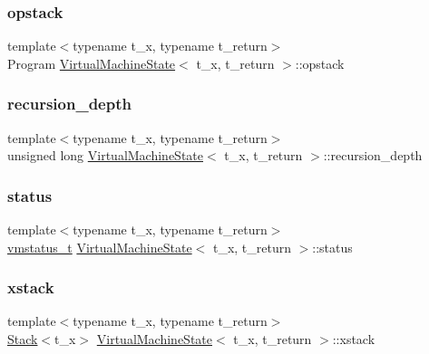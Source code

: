 \subsubsection{\texorpdfstring{opstack}{opstack}}
{\footnotesize\ttfamily template$<$typename t\+\_\+x, typename t\+\_\+return$>$ \\
Program \hyperlink{class_virtual_machine_state}{Virtual\+Machine\+State}$<$ t\+\_\+x, t\+\_\+return $>$\+::opstack}

\mbox{\label{class_virtual_machine_state_a9d28667bb71e7a7aad5dabdc41dd55d0}} 
\subsubsection{\texorpdfstring{recursion\+\_\+depth}{recursion\_depth}}
{\footnotesize\ttfamily template$<$typename t\+\_\+x, typename t\+\_\+return$>$ \\
unsigned long \hyperlink{class_virtual_machine_state}{Virtual\+Machine\+State}$<$ t\+\_\+x, t\+\_\+return $>$\+::recursion\+\_\+depth}

\mbox{\label{class_virtual_machine_state_aa78c1891f8a2a656a0b60cd8a698b41d}} 
\subsubsection{\texorpdfstring{status}{status}}
{\footnotesize\ttfamily template$<$typename t\+\_\+x, typename t\+\_\+return$>$ \\
\hyperlink{_instruction_8h_a6202215407ab29590bb936ca2996cf64}{vmstatus\+\_\+t} \hyperlink{class_virtual_machine_state}{Virtual\+Machine\+State}$<$ t\+\_\+x, t\+\_\+return $>$\+::status}

\mbox{\label{class_virtual_machine_state_a83d4e418eee2f9208641bb12c99bd7fb}} 
\subsubsection{\texorpdfstring{xstack}{xstack}}
{\footnotesize\ttfamily template$<$typename t\+\_\+x, typename t\+\_\+return$>$ \\
\hyperlink{class_stack}{Stack}$<$t\+\_\+x$>$ \hyperlink{class_virtual_machine_state}{Virtual\+Machine\+State}$<$ t\+\_\+x, t\+\_\+return $>$\+::xstack}



